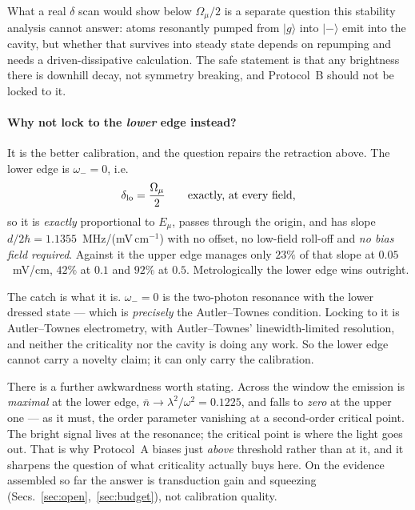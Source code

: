 \documentclass[11pt,a4paper]{article}
\newcommand{\Omu}{\Omega_{\mu}}
\newcommand{\ket}[1]{\lvert #1 \rangle}
\begin{document}
What a real $\delta$ scan would show below $\Omu/2$ is a separate question this stability
analysis cannot answer: atoms resonantly pumped from $\ket{g}$ into $\ket{-}$ emit into the
cavity, but whether that survives into steady state depends on repumping and needs a
driven-dissipative calculation. The safe statement is that any brightness there is downhill
decay, not symmetry breaking, and Protocol~B should not be locked to it.

\paragraph{Why not lock to the \emph{lower} edge instead?} It is the better calibration, and
the question repairs the retraction above. The lower edge is $\omega_-=0$, i.e.
\begin{equation}
  \delta_{\rm lo} = \frac{\Omu}{2} \qquad\text{exactly, at every field,}
\end{equation}
so it is \emph{exactly} proportional to $E_\mu$, passes through the origin, and has slope
$d/2\hbar=1.1355$~MHz/(mV\,cm$^{-1}$) with no offset, no low-field roll-off and \emph{no bias
field required}. Against it the upper edge manages only $23\%$ of that slope at
$0.05$~mV/cm, $42\%$ at $0.1$ and $92\%$ at $0.5$. Metrologically the lower edge wins outright.

The catch is what it is. $\omega_-=0$ is the two-photon resonance with the lower dressed state
--- which is \emph{precisely} the Autler--Townes condition. Locking to it is Autler--Townes
electrometry, with Autler--Townes' linewidth-limited resolution, and neither the criticality
nor the cavity is doing any work. So the lower edge cannot carry a novelty claim; it can only
carry the calibration.

There is a further awkwardness worth stating. Across the window the emission is
\emph{maximal} at the lower edge, $\bar n\to\lambda^2/\omega^2=0.1225$, and falls to
\emph{zero} at the upper one --- as it must, the order parameter vanishing at a second-order
critical point. The bright signal lives at the resonance; the critical point is where the
light goes out. That is why Protocol~A biases just \emph{above} threshold rather than at it,
and it sharpens the question of what criticality actually buys here. On the evidence
assembled so far the answer is transduction gain and squeezing
(Secs.~\ref{sec:open},~\ref{sec:budget}), not calibration quality.
\end{document}
